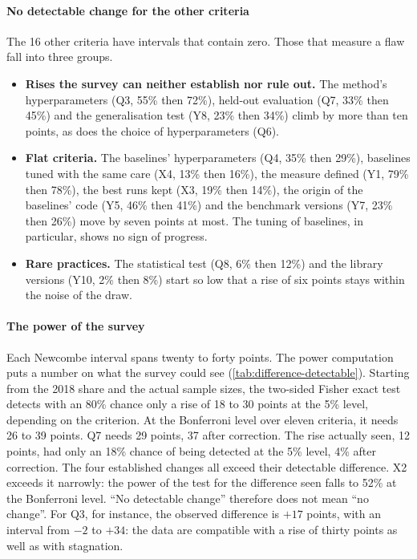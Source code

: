 \paragraph{No detectable change for the other criteria}
The 16 other criteria have intervals that contain zero. Those that measure a flaw fall into three groups.
\begin{itemize}
  \item \textbf{Rises the survey can neither establish nor rule out.} The method's hyperparameters (Q3,
  55\% then 72\%), held-out evaluation (Q7, 33\% then 45\%) and the generalisation test (Y8, 23\% then
  34\%) climb by more than ten points, as does the choice of hyperparameters (Q6).
  \item \textbf{Flat criteria.} The baselines' hyperparameters (Q4, 35\% then 29\%), baselines tuned with
  the same care (X4, 13\% then 16\%), the measure defined (Y1, 79\% then 78\%), the best runs kept (X3,
  19\% then 14\%), the origin of the baselines' code (Y5, 46\% then 41\%) and the benchmark versions (Y7,
  23\% then 26\%) move by seven points at most. The tuning of baselines, in particular, shows no sign of
  progress.
  \item \textbf{Rare practices.} The statistical test (Q8, 6\% then 12\%) and the library versions (Y10,
  2\% then 8\%) start so low that a rise of six points stays within the noise of the draw.
\end{itemize}

\paragraph{The power of the survey}
Each Newcombe interval spans twenty to forty points. The power computation puts a number on what the
survey could see (\cref{tab:difference-detectable}). Starting from the
2018 share and the actual sample sizes, the two-sided Fisher exact test detects with an 80\% chance only a rise
of 18 to 30 points at the 5\% level, depending on the criterion. At the Bonferroni level over eleven criteria,
it needs 26 to 39 points. Q7 needs 29 points, 37 after correction. The rise actually seen, 12 points, had
only an 18\% chance of being detected at the 5\% level, 4\% after correction. The four established changes
all exceed their detectable difference. X2 exceeds it narrowly: the power of the test for the difference seen falls to
52\% at the Bonferroni level. \enquote{No detectable change} therefore does not mean \enquote{no change}. For
Q3, for instance, the observed difference is $+17$ points, with an interval from $-2$ to $+34$: the data are
compatible with a rise of thirty points as well as with stagnation.


